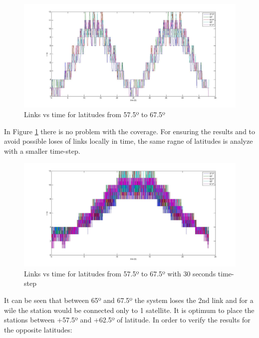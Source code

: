 \begin{figure}[H]
\begin{center}
\includegraphics[scale=0.30]{575_25_675_lat.jpg}
\caption{Links vs time for latitudes from 57.5º to 67.5º}
\label{fig:lat6}
\end{center}
\end{figure}
In Figure \ref{fig:lat6} there is no problem with the coverage. For ensuring the results and to avoid possible loses of links locally in time, the same ragne of latitudes is analyze with a smaller time-step.
\begin{figure}[H]
\begin{center}
\includegraphics[scale=0.30]{575_25_675_(30s)_lat.jpg}
\caption{Links vs time for latitudes from 57.5º to 67.5º with 30 seconds time-step}
\label{fig:lat7}
\end{center}
\end{figure}
It can be seen that between 65º and 67.5º the system loses the 2nd link and for a wile the station would be connected only to 1 satellite. It is optimum to place the stations between +57.5º and +62.5º of latitude. In order to verify the results for the opposite latitudes:
